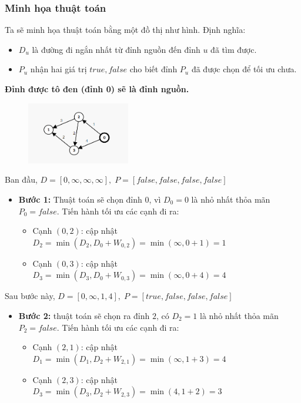 \documentclass{article}
\begin{document}
\subsubsection*{Minh họa thuật toán}

Ta sẽ minh họa thuật toán bằng một đồ thị như hình. Định nghĩa:
\begin{itemize}
    \item $D_u$ là đường đi ngắn nhất từ đỉnh nguồn đến đỉnh $u$ đã tìm được.
    \item $P_u$ nhận hai giá trị $true, false$ cho biết đỉnh $P_u$ đã được chọn để tối ưu chưa.
\end{itemize}

\textbf{Đỉnh được tô đen (đỉnh 0) sẽ là đỉnh nguồn.}

\begin{figure}[h]
    \centering
    \includegraphics[width=0.4\textwidth]{img/b7/dijkstra_2.png}
\end{figure}
Ban đầu, $D = [0, \infty, \infty, \infty],\; P = [false, false, false, false]$

\begin{itemize}
    \item \textbf{Bước 1:} Thuật toán sẽ chọn đỉnh $0$, vì $D_0 = 0$ là nhỏ nhất thỏa mãn $P_0 = false$. Tiến hành tối ưu các cạnh đi ra:
    \begin{itemize}
        \item Cạnh $(0,2)$: cập nhật $D_2 = \min(D_2, D_0 + W_{0,2}) = \min(\infty, 0+1) = 1$
        \item Cạnh $(0,3)$: cập nhật $D_3 = \min(D_3, D_0 + W_{0,3}) = \min(\infty, 0+4) = 4$
    \end{itemize}
\end{itemize}

Sau bước này, $D = [0, \infty, 1, 4],\; P = [true, false, false, false]$

\begin{itemize}
    \item \textbf{Bước 2:} thuật toán sẽ chọn ra đỉnh $2$, có $D_2 = 1$ là nhỏ nhất thỏa mãn $P_2 = false$. Tiến hành tối ưu các cạnh đi ra:
    \begin{itemize}
        \item Cạnh $(2,1)$: cập nhật $D_1 = \min(D_1, D_2 + W_{2,1}) = \min(\infty, 1 + 3) = 4$
        \item Cạnh $(2,3)$: cập nhật $D_3 = \min(D_3, D_2 + W_{2,3}) = \min(4, 1 + 2) = 3$
    \end{itemize}
\end{itemize}
\end{document}
